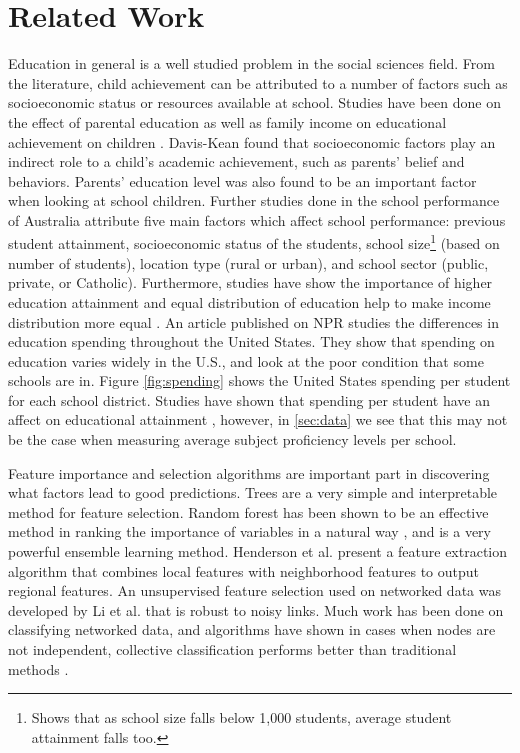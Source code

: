 \section{Related Work} \label{sec:relwork}

Education in general is a well studied problem in the social sciences field. From the literature, child achievement can be attributed to a number of factors such as socioeconomic status or resources available at school. Studies have been done on the effect of parental education as well as family income on educational achievement on children \cite{parentinfluence2005}. Davis-Kean found that socioeconomic factors play an indirect role to a child's academic achievement, such as parents' belief and behaviors. Parents' education level was also found to be an important factor when looking at school children. Further studies done in the school performance of Australia \cite{australiaschool2004} attribute five main factors which affect school performance: previous student attainment, socioeconomic status of the students, school size\footnote{Shows that as school size falls below 1,000 students, average student attainment falls too.} (based on number of students), location type (rural or urban), and school sector (public, private, or Catholic). Furthermore, studies have show the importance of higher education attainment and equal distribution of education help to make income distribution more equal \cite{income2002greg, income2015breen}. An article published on NPR \cite{npr2016} studies the differences in education spending throughout the United States. They show that spending on education varies widely in the U.S., and look at the poor condition that some schools are in. Figure \ref{fig:spending} shows the United States spending per student for each school district. Studies have shown that spending per student have an affect on educational attainment \cite{spending2015, spending2017}, however, in \ref{sec:data} we see that this may not be the case when measuring average subject proficiency levels per school.

Feature importance and selection algorithms are important part in discovering what factors lead to good predictions. Trees are a very simple and interpretable method for feature selection. Random forest has been shown to be an effective method in ranking the importance of variables in a natural way \cite{breiman2001random}, and is a very powerful ensemble learning method. Henderson et al. \cite{recursive2011} present a feature extraction algorithm that combines local features with neighborhood features to output regional features. An unsupervised feature selection used on networked data was developed by Li et al. \cite{robustfeature2016} that is robust to noisy links. Much work has been done on classifying networked data, and algorithms have shown in cases when nodes are not independent, collective classification performs better than traditional methods \cite{collective2008}.

